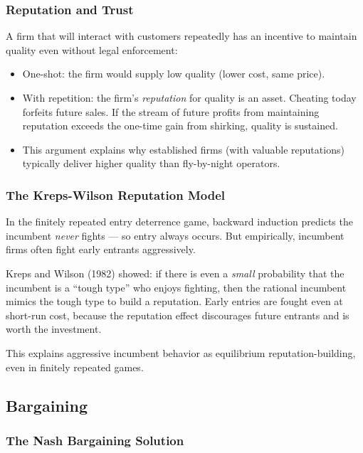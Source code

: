 \documentclass[hidelinks]{article}
\begin{document}
\subsubsection{Reputation and Trust}

A firm that will interact with customers repeatedly has an incentive to maintain quality even without legal enforcement:

\begin{itemize}
    \item One-shot: the firm would supply low quality (lower cost, same price).
    \item With repetition: the firm's \textit{reputation} for quality is an asset. Cheating today forfeits future sales. If the stream of future profits from maintaining reputation exceeds the one-time gain from shirking, quality is sustained.
    \item This argument explains why established firms (with valuable reputations) typically deliver higher quality than fly-by-night operators.
\end{itemize}

\subsubsection{The Kreps-Wilson Reputation Model}

In the finitely repeated entry deterrence game, backward induction predicts the incumbent \textit{never} fights — so entry always occurs. But empirically, incumbent firms often fight early entrants aggressively.

Kreps and Wilson (1982) showed: if there is even a \textit{small} probability that the incumbent is a ``tough type'' who enjoys fighting, then the rational incumbent mimics the tough type to build a reputation. Early entries are fought even at short-run cost, because the reputation effect discourages future entrants and is worth the investment.

This explains aggressive incumbent behavior as equilibrium reputation-building, even in finitely repeated games.

\subsection{Bargaining}

\subsubsection{The Nash Bargaining Solution}
\end{document}
